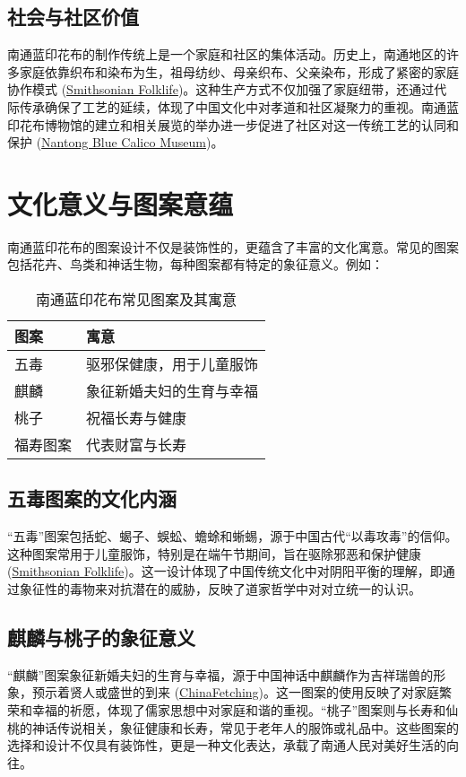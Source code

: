 \documentclass[12pt]{article}
\begin{document}
\subsection{社会与社区价值}
南通蓝印花布的制作传统上是一个家庭和社区的集体活动。历史上，南通地区的许多家庭依靠织布和染布为生，祖母纺纱、母亲织布、父亲染布，形成了紧密的家庭协作模式 (\href{https://folklife.si.edu/magazine/blue-calico-cloth-nantong-china}{Smithsonian Folklife})。这种生产方式不仅加强了家庭纽带，还通过代际传承确保了工艺的延续，体现了中国文化中对孝道和社区凝聚力的重视。南通蓝印花布博物馆的建立和相关展览的举办进一步促进了社区对这一传统工艺的认同和保护 (\href{http://en.nantong.gov.cn/2018-07/17/c_369249.htm}{Nantong Blue Calico Museum})。

\section{文化意义与图案意蕴}
南通蓝印花布的图案设计不仅是装饰性的，更蕴含了丰富的文化寓意。常见的图案包括花卉、鸟类和神话生物，每种图案都有特定的象征意义。例如：

\begin{table}[h]
\centering
\caption{南通蓝印花布常见图案及其寓意}
\begin{tabular}{ll}
\toprule
\textbf{图案} & \textbf{寓意} \\
\midrule
五毒 & 驱邪保健康，用于儿童服饰 \\
麒麟 & 象征新婚夫妇的生育与幸福 \\
桃子 & 祝福长寿与健康 \\
福寿图案 & 代表财富与长寿 \\
\bottomrule
\end{tabular}
\end{table}

\subsection{五毒图案的文化内涵}
“五毒”图案包括蛇、蝎子、蜈蚣、蟾蜍和蜥蜴，源于中国古代“以毒攻毒”的信仰。这种图案常用于儿童服饰，特别是在端午节期间，旨在驱除邪恶和保护健康 (\href{https://folklife.si.edu/magazine/blue-calico-cloth-nantong-china}{Smithsonian Folklife})。这一设计体现了中国传统文化中对阴阳平衡的理解，即通过象征性的毒物来对抗潜在的威胁，反映了道家哲学中对对立统一的认识。

\subsection{麒麟与桃子的象征意义}
“麒麟”图案象征新婚夫妇的生育与幸福，源于中国神话中麒麟作为吉祥瑞兽的形象，预示着贤人或盛世的到来 (\href{https://www.chinafetching.com/qilin}{ChinaFetching})。这一图案的使用反映了对家庭繁荣和幸福的祈愿，体现了儒家思想中对家庭和谐的重视。“桃子”图案则与长寿和仙桃的神话传说相关，象征健康和长寿，常见于老年人的服饰或礼品中。这些图案的选择和设计不仅具有装饰性，更是一种文化表达，承载了南通人民对美好生活的向往。
\end{document}
